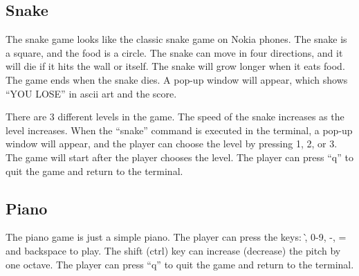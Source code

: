 \documentclass[
	a4paper, %
	11pt, %
]{CSUniSchoolLabReport}
\begin{document}
\subsection{Snake}
The snake game looks like the classic snake game on Nokia phones. The snake is a square, and the food is a circle. The snake can move in four directions, and it will die if it hits the wall or itself. The snake will grow longer when it eats food. The game ends when the snake dies. A pop-up window will appear, which shows ``YOU LOSE'' in ascii art and the score.

There are 3 different levels in the game. The speed of the snake increases as the level increases. When the ``snake'' command is executed in the terminal, a pop-up window will appear, and the player can choose the level by pressing 1, 2, or 3. The game will start after the player chooses the level. The player can press ``q'' to quit the game and return to the terminal.
\subsection{Piano}
The piano game is just a simple piano. The player can press the keys: \`, 0-9, -, = and backspace to play. The shift (ctrl) key can increase (decrease) the pitch by one octave. The player can press ``q'' to quit the game and return to the terminal.
\end{document}
